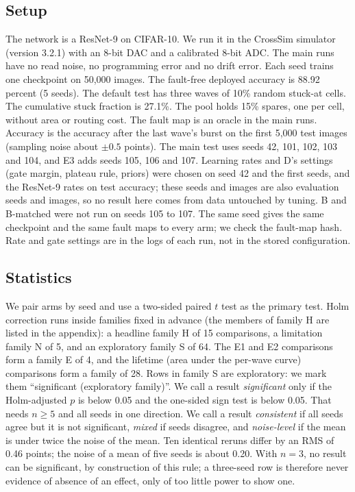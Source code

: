 \documentclass[journal]{IEEEtran}
\begin{document}
\subsection{Setup}
The network is a ResNet-9 on CIFAR-10.
We run it in the CrossSim simulator (version 3.2.1) with an 8-bit DAC and a calibrated 8-bit ADC.
The main runs have no read noise, no programming error and no drift error.
Each seed trains one checkpoint on 50,000 images.
The fault-free deployed accuracy is 88.92 percent (5 seeds).
The default test has three waves of 10\% random stuck-at cells.
The cumulative stuck fraction is 27.1\%.
The pool holds 15\% spares, one per cell, without area or routing cost.
The fault map is an oracle in the main runs.
Accuracy is the accuracy after the last wave's burst on the first 5,000 test images (sampling noise about $\pm 0.5$ points).
The main test uses seeds 42, 101, 102, 103 and 104, and E3 adds seeds 105, 106 and 107.
Learning rates and D's settings (gate margin, plateau rule, priors) were chosen on seed 42 and the first seeds, and the ResNet-9 rates on test accuracy; these seeds and images are also evaluation seeds and images, so no result here comes from data untouched by tuning.
B and B-matched were not run on seeds 105 to 107.
The same seed gives the same checkpoint and the same fault maps to every arm; we check the fault-map hash.
Rate and gate settings are in the logs of each run, not in the stored configuration.

\subsection{Statistics}
We pair arms by seed and use a two-sided paired $t$ test as the primary test.
Holm correction runs inside families fixed in advance (the members of family H are listed in the appendix): a headline family H of 15 comparisons, a limitation family N of 5, and an exploratory family S of 64.
The E1 and E2 comparisons form a family E of 4, and the lifetime (area under the per-wave curve) comparisons form a family of 28.
Rows in family S are exploratory: we mark them ``significant (exploratory family)''.
We call a result \emph{significant} only if the Holm-adjusted $p$ is below 0.05 and the one-sided sign test is below 0.05.
That needs $n \ge 5$ and all seeds in one direction.
We call a result \emph{consistent} if all seeds agree but it is not significant, \emph{mixed} if seeds disagree, and \emph{noise-level} if the mean is under twice the noise of the mean.
Ten identical reruns differ by an RMS of 0.46 points; the noise of a mean of five seeds is about 0.20.
With $n=3$, no result can be significant, by construction of this rule; a three-seed row is therefore never evidence of absence of an effect, only of too little power to show one.
\end{document}
